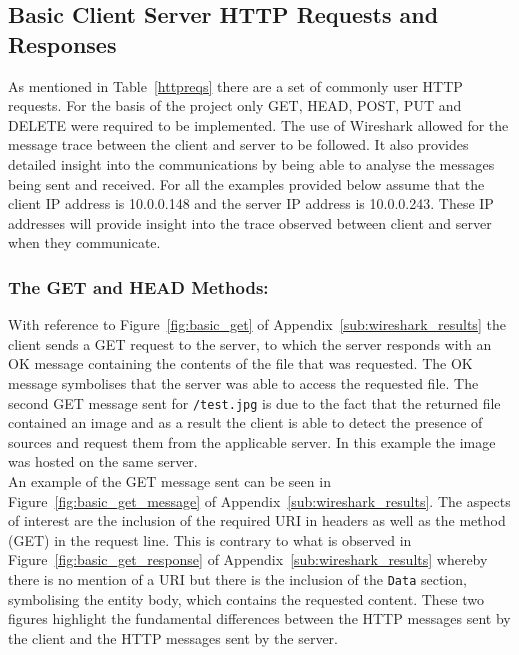 \documentclass[10pt,twocolumn]{witseiepaper}
\begin{document}
	\subsection{Basic Client Server HTTP Requests and Responses} %
	\label{sub:basic_client_server}
		
		As mentioned in Table~\ref{httpreqs} there are a set of commonly user HTTP requests. For the basis of the project only GET, HEAD, POST, PUT and DELETE were required to be implemented. The use of Wireshark allowed for the message trace between the client and server to be followed. It also provides detailed insight into the communications by being able to analyse the messages being sent and received. For all the examples provided below assume that the client IP address is 10.0.0.148 and the server IP address is 10.0.0.243. These IP addresses will provide insight into the trace observed between client and server when they communicate.
		
		\subsubsection*{The GET and HEAD Methods:} With reference to Figure~\ref{fig:basic_get} of Appendix~\ref{sub:wireshark_results} the client sends a GET request to the server, to which the server responds with an OK message containing the contents of the file that was requested. The OK message symbolises that the server was able to access the requested file. The second GET message sent for \texttt{/test.jpg} is due to the fact that the returned file contained an image and as a result the client is able to detect the presence of sources and request them from the applicable server. In this example the image was hosted on the same server. \\
		
		An example of the GET message sent can be seen in Figure~\ref{fig:basic_get_message} of Appendix~\ref{sub:wireshark_results}. The aspects of interest are the inclusion of the required URI in headers as well as the method (GET) in the request line. This is contrary to what is observed in Figure~\ref{fig:basic_get_response} of Appendix~\ref{sub:wireshark_results} whereby there is no mention of a URI but there is the inclusion of the \texttt{Data} section, symbolising the entity body, which contains the requested content. These two figures highlight the fundamental differences between the HTTP messages sent by the client and the HTTP messages sent by the server. \\
		
\end{document}
